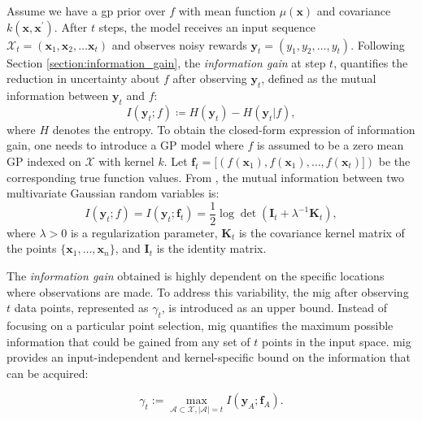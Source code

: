 Assume we have a \ac{gp} prior over \( f \) with mean function \( \mu(\mathbf{x}) \) and covariance \( k(\mathbf{x}, \mathbf{x}^\prime) \). After $t$ steps, the model receives an input sequence $\mathcal{X}_t = (\mathbf{x}_1, \mathbf{x}_2, \dots  \mathbf{x}_t)$ and observes noisy rewards $\mathbf{y}_t = (y_1, y_2, \dots, y_t)$. Following Section \ref{section:information_gain}, the \emph{information gain} at step $t$, quantifies the reduction in uncertainty about $f$ after observing $\mathbf{y}_t$, defined as the mutual information between  $\mathbf{y}_t$ and $f$:
\[
I(\mathbf{y}_t; f) \coloneqq  H(\mathbf{y}_t) - H(\mathbf{y}_t \rvert f), 
\]
where $H$ denotes the entropy. To obtain the closed-form expression of information gain, one needs to introduce a GP model where $f$ is assumed to be a zero mean GP indexed on $\mathcal X$ with kernel $k$. Let $\mathbf{f}_t = [\left(f(\mathbf{x}_1), f(\mathbf{x}_1), \dots, f(\mathbf{x}_t)] \right)$ be the corresponding true function values.  From \citet{cover1999elements}, the mutual information between two multivariate Gaussian random variables is: 
\[ I(\mathbf{y}_t; f) = I(\mathbf{y}_t; \mathbf{f}_t) = \frac{1}{2} \log \det (\mathbf{I}_t + \lambda^{-1}\mathbf{K}_t), \]
where $\lambda > 0$ is a regularization parameter, $\mathbf{K}_t$ is the covariance kernel matrix of the points \( \{\mathbf{x}_1, \dots, \mathbf{x}_n\} \),
and \( \mathbf{I}_t \) is the identity matrix.


The \textit{information gain} obtained is highly dependent on the specific locations where observations are made. To address this variability, the \acf{mig} after observing $t$ data points, represented as $\gamma_t$, is introduced as an upper bound. Instead of focusing on a particular point selection, \ac{mig} quantifies the maximum possible information that could be gained from any set of $t$ points in the input space. \ac{mig} provides an input-independent and kernel-specific bound on the information that can be acquired:

\[ \gamma_t := \max_{\mathcal{A} \subset \mathcal{X}, \lvert \mathcal{A} \rvert = t} I(\mathbf{y}_A; \mathbf{f}_A).\]

